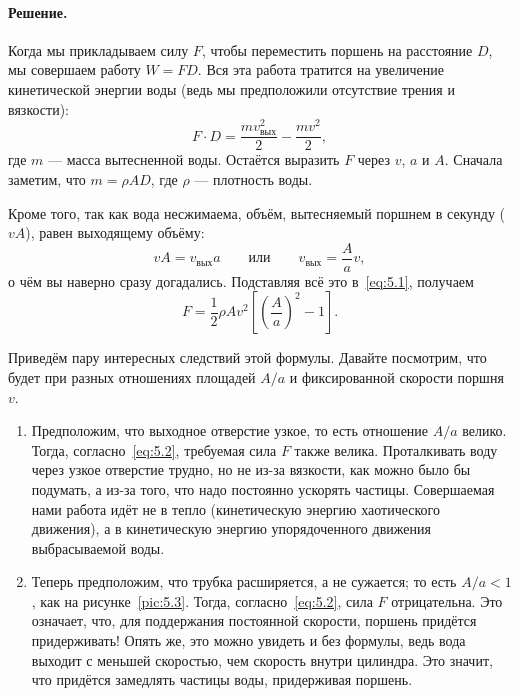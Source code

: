 \paragraph{Решение.}
Когда мы прикладываем силу $F$, чтобы переместить поршень на расстояние $D$, мы совершаем работу $W=F D$.
Вся эта работа тратится на увеличение кинетической энергии воды (ведь мы предположили отсутствие трения и вязкости):
\begin{equation}
F \cdot D=\frac{m v_{\text{вых}}^{2}}{2} - \frac{m v^{2}}{2},
\label{eq:5.1}
\end{equation}
где $m$ --- масса вытесненной воды.
Остаётся выразить $F$ через $v$, $a$ и $A$.
Сначала заметим, что $m=\rho A D$, где $\rho$ --- плотность воды.

Кроме того, так как вода несжимаема, объём, вытесняемый поршнем в секунду ($vA$), равен выходящему объёму:
\[
vA=v_{\text{вых}} a
\qquad\text{или}\qquad
v_{\text{вых}}=\frac{A}{a} v,
\]
о чём вы наверно сразу догадались.
Подставляя всё это в~\eqref{eq:5.1}, получаем
\begin{equation}
F=\frac12\rho A v^{2} \left[ \left(\frac{A}{a}\right)^2  - 1 \right].
\label{eq:5.2}
\end{equation}

Приведём пару интересных следствий этой формулы.
Давайте посмотрим, что будет при разных отношениях площадей $A/a$ и фиксированной скорости поршня $v$.
\begin{enumerate}
\item
Предположим, что выходное отверстие узкое, то есть отношение $A/a$ велико.
Тогда, согласно~\eqref{eq:5.2}, требуемая сила $F$ также велика.
Проталкивать воду через узкое отверстие трудно, но не из-за вязкости, как можно было бы подумать, а из-за того, что надо постоянно ускорять частицы.
Совершаемая нами работа идёт не в тепло (кинетическую энергию хаотического движения), а в кинетическую энергию упорядоченного движения выбрасываемой воды.
\item
Теперь предположим, что трубка расширяется, а не сужается; то есть $A/a < 1$, как на рисунке~\ref{pic:5.3}.
Тогда, согласно~\eqref{eq:5.2}, сила $F$ отрицательна.
Это означает, что, для поддержания постоянной скорости, поршень придётся придерживать!
Опять же, это можно увидеть и без формулы, ведь вода выходит с меньшей скоростью, чем скорость внутри цилиндра.
Это значит, что придётся замедлять частицы воды, придерживая поршень.
\end{enumerate}

